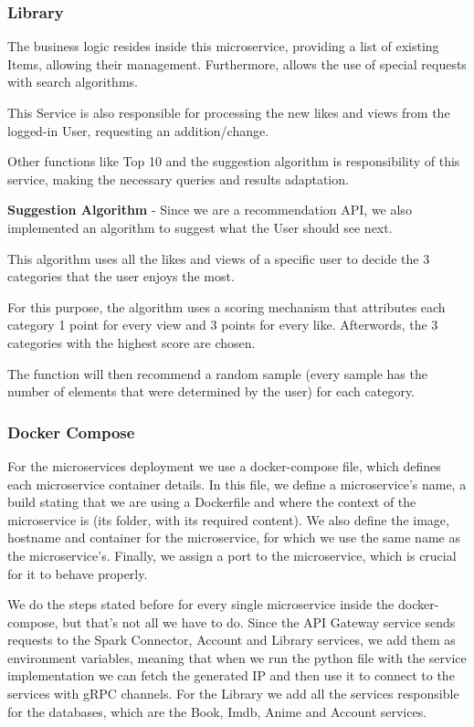 \documentclass[oneside]{article}
\newcommand*\fpar{\hspace{1ex}}
\begin{document}
    \subsubsection{Library}
    \fpar The business logic resides inside this microservice, providing a list of existing Items, allowing their management. Furthermore, allows the use of special requests with search algorithms.
    \par This Service is also responsible for processing the new likes and views from the logged-in User, requesting an addition/change.
    \par Other functions like Top 10 and the suggestion algorithm is responsibility of this service, making the necessary queries and results adaptation.
    \par \textbf{Suggestion Algorithm} - Since we are a recommendation API, we also implemented an algorithm to suggest what the User should see next.
    \par This algorithm uses all the likes and views of a specific user to decide the 3 categories that the user enjoys the most. 
    \par For this purpose, the algorithm uses a scoring mechanism that attributes each category 1 point for every view and 3 points for every like. Afterwords, the 3 categories with the highest score are chosen. 
    \par The function will then recommend a random sample (every sample has the number of elements that were determined by the user) for each category.

    \subsubsection{Docker Compose}
    \fpar For the microservices deployment we use a docker-compose file, which defines each microservice container details. In this file, we define a microservice's name, a build stating that we are using a Dockerfile and where the context of the microservice is (its folder, with its required content). We also define the image, hostname and container for the microservice, for which we use the same name as the microservice's. Finally, we assign a port to the microservice, which is crucial for it to behave properly.
    \par We do the steps stated before for every single microservice inside the docker-compose, but that's not all we have to do. Since the API Gateway service sends requests to the Spark Connector, Account and Library services, we add them as environment variables, meaning that when we run the python file with the service implementation we can fetch the generated IP and then use it to connect to the services with gRPC channels. For the Library we add all the services responsible for the databases, which are the Book, Imdb, Anime and Account services.
\end{document}
